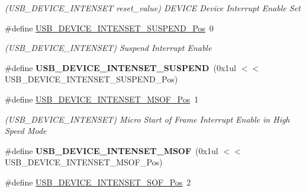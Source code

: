 \begin{DoxyCompactItemize}
\begin{DoxyCompactList}\small\item\em (U\+S\+B\+\_\+\+D\+E\+V\+I\+C\+E\+\_\+\+I\+N\+T\+E\+N\+S\+E\+T reset\+\_\+value) D\+E\+V\+I\+C\+E Device Interrupt Enable Set \end{DoxyCompactList}\item 
\hypertarget{group___s_a_m_l21___u_s_b_ga70a4286b9f7c148f62246dea0e6d60fc}{}\#define \hyperlink{group___s_a_m_l21___u_s_b_ga70a4286b9f7c148f62246dea0e6d60fc}{U\+S\+B\+\_\+\+D\+E\+V\+I\+C\+E\+\_\+\+I\+N\+T\+E\+N\+S\+E\+T\+\_\+\+S\+U\+S\+P\+E\+N\+D\+\_\+\+Pos}~0\label{group___s_a_m_l21___u_s_b_ga70a4286b9f7c148f62246dea0e6d60fc}

\begin{DoxyCompactList}\small\item\em (U\+S\+B\+\_\+\+D\+E\+V\+I\+C\+E\+\_\+\+I\+N\+T\+E\+N\+S\+E\+T) Suspend Interrupt Enable \end{DoxyCompactList}\item 
\hypertarget{group___s_a_m_l21___u_s_b_ga7b086b0cfbf1d70da8275e466dfc2094}{}\#define {\bfseries U\+S\+B\+\_\+\+D\+E\+V\+I\+C\+E\+\_\+\+I\+N\+T\+E\+N\+S\+E\+T\+\_\+\+S\+U\+S\+P\+E\+N\+D}~(0x1ul $<$$<$ U\+S\+B\+\_\+\+D\+E\+V\+I\+C\+E\+\_\+\+I\+N\+T\+E\+N\+S\+E\+T\+\_\+\+S\+U\+S\+P\+E\+N\+D\+\_\+\+Pos)\label{group___s_a_m_l21___u_s_b_ga7b086b0cfbf1d70da8275e466dfc2094}

\item 
\hypertarget{group___s_a_m_l21___u_s_b_ga1cd2ec3d87a441e97fdc34e30d77f965}{}\#define \hyperlink{group___s_a_m_l21___u_s_b_ga1cd2ec3d87a441e97fdc34e30d77f965}{U\+S\+B\+\_\+\+D\+E\+V\+I\+C\+E\+\_\+\+I\+N\+T\+E\+N\+S\+E\+T\+\_\+\+M\+S\+O\+F\+\_\+\+Pos}~1\label{group___s_a_m_l21___u_s_b_ga1cd2ec3d87a441e97fdc34e30d77f965}

\begin{DoxyCompactList}\small\item\em (U\+S\+B\+\_\+\+D\+E\+V\+I\+C\+E\+\_\+\+I\+N\+T\+E\+N\+S\+E\+T) Micro Start of Frame Interrupt Enable in High Speed Mode \end{DoxyCompactList}\item 
\hypertarget{group___s_a_m_l21___u_s_b_ga9945869b0b6f326002518fbbe0278e6c}{}\#define {\bfseries U\+S\+B\+\_\+\+D\+E\+V\+I\+C\+E\+\_\+\+I\+N\+T\+E\+N\+S\+E\+T\+\_\+\+M\+S\+O\+F}~(0x1ul $<$$<$ U\+S\+B\+\_\+\+D\+E\+V\+I\+C\+E\+\_\+\+I\+N\+T\+E\+N\+S\+E\+T\+\_\+\+M\+S\+O\+F\+\_\+\+Pos)\label{group___s_a_m_l21___u_s_b_ga9945869b0b6f326002518fbbe0278e6c}

\item 
\hypertarget{group___s_a_m_l21___u_s_b_ga144eafc8845cb6e24bf1404da0f42875}{}\#define \hyperlink{group___s_a_m_l21___u_s_b_ga144eafc8845cb6e24bf1404da0f42875}{U\+S\+B\+\_\+\+D\+E\+V\+I\+C\+E\+\_\+\+I\+N\+T\+E\+N\+S\+E\+T\+\_\+\+S\+O\+F\+\_\+\+Pos}~2\label{group___s_a_m_l21___u_s_b_ga144eafc8845cb6e24bf1404da0f42875}


\end{DoxyCompactItemize}
